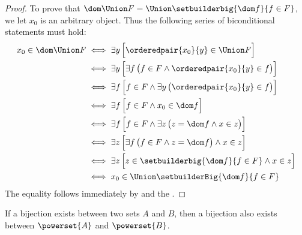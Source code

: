 \begin{proof}
    \vspace{0.3cm}
    \noindent
    To prove that \( \dom \Union F = \Union \setbuilderbig{\dom f}{f \in F} \), we let \( x_{0} \) is an arbitrary object.
    Thus the following series of biconditional statements must hold:
    \begin{align*}
        x_{0} \in \dom \Union F
        &\iff
        \exists y \, \Big[ \orderedpair{x_{0}}{y} \in \Union F \Big] \\
        &\iff
        \exists y \, \Big[ \exists f \, \big( f \in F \land \orderedpair{x_{0}}{y} \in f \big) \Big] \\
        &\iff
        \exists f \, \Big[ f \in F \land \exists y \, \big( \orderedpair{x_{0}}{y} \in f \big) \Big] \\
        &\iff
        \exists f \, \Big[ f \in F \land x_{0} \in \dom f \Big] \\
        &\iff
        \exists f \, \Big[ f \in F \land \exists z \, \big( z = \dom f \land x \in z \big) \Big]\\
        &\iff
        \exists z \, \Big[ \exists f \, \big( f \in F \land z = \dom f \big) \land x \in z \Big] \\
        &\iff
        \exists z \, \Big[ z \in \setbuilderbig{\dom f}{f \in F} \land x \in z \Big] \\
        &\iff
        x_{0} \in \Union \setbuilderBig{\dom f}{f \in F}
    \end{align*}
    The equality follows immediately by  and the .
\end{proof}

\begin{thm}
     \label{thm:bijection-between-sets-implies-bijection-between-powersets}
    If a bijection exists between two sets \( A \) and \( B \), then a bijection also exists
    between \( \powerset{A} \) and \( \powerset{B} \).
\end{thm}

